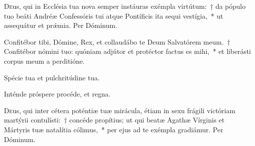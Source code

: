 \documentclass[vesperale_romanum.tex]{subfiles}
\begin{document}
\lettrine{D}{e}us, qui in Ecclésia tua nova semper instáuras exémpla virtútum:~† da pópulo tuo beáti Andréæ Confessóris tui atque Pontíficis ita sequi vestígia,~* ut assequátur et prǽmia. Per Dóminum.

\myrule


\duplex





\lettrine{C}{o}nfitébor tibi, Dómine, Rex, et collaudábo te Deum Salvatórem meum.~† Confitébor nómini tuo: quóniam adjútor et proté\-ctor fa\-ctus es mihi,~* et liberásti corpus meum a perditióne.


\vv Spécie tua et pulchritúdine tua.

\rr Inténde próspere procéde, et regna.

\admagnificat

\label{an_stans_beata_agatha_solesmes_1961}


\oratio

\lettrine{D}{e}us, qui inter cétera poténtiæ tuæ mirácula, étiam in sexu frágili vi\-ctóriam martýrii contulísti:~† concéde propítius; ut qui beatæ Agathæ Vírginis et Mártyris tuæ natalítia cólimus,~* per ejus ad te exémpla gradiámur. Per Dóminum.





\end{document}

